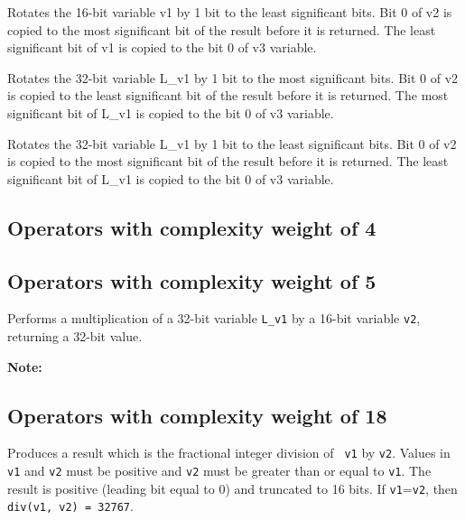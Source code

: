Rotates the 16-bit variable v1 by 1 bit to the least significant
bits. Bit 0 of v2 is copied to the most significant bit of the
result before it is returned. The least significant bit of v1 is
copied to the bit 0 of v3 variable.


 

Rotates the 32-bit variable L\_v1 by 1 bit to the most significant
bits. Bit 0 of v2 is copied to the least significant bit of the
result before it is returned. The most significant bit of L\_v1 is
copied to the bit 0 of v3 variable.


 

Rotates the 32-bit variable L\_v1 by 1 bit to the least significant bits.
Bit 0 of v2 is copied to the most significant bit of the result before it is returned.
The least significant bit of L\_v1 is copied to the bit 0 of v3 variable.


\subsection{Operators with complexity weight of 4}


\enlargethispage*{10mm}

\subsection{Operators with complexity weight of 5}


Performs a multiplication of a 32-bit variable {\tt L\_v1} by a 16-bit
variable {\tt v2}, returning a 32-bit value.

\textbf{Note:} \hfill {}

\subsection{Operators with complexity weight of 18}



Produces a result which is the fractional integer division of {\tt
v1} by {\tt v2}. Values in {\tt v1} and {\tt v2} must be positive
and {\tt v2} must be greater than or equal to {\tt v1}. The result
is positive (leading bit equal to 0) and truncated to 16 bits. If
{\tt v1}={\tt v2}, then {\tt div(v1, v2) = 32767}.

